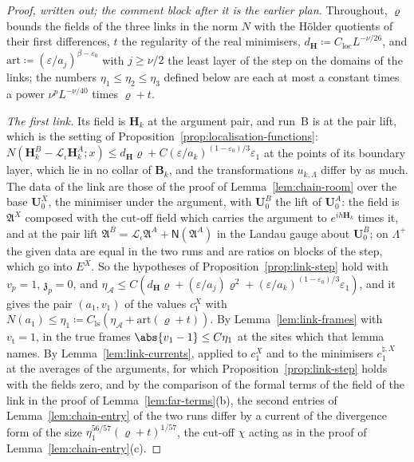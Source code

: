 \begin{proof}[Proof, written out; the comment block after it is the earlier plan]
Throughout, $\varrho$ bounds the fields of the three links in the norm $N$ with the H\"older quotients of their first differences, $t$ the regularity of the real minimisers, $d_{\mathbf H} \coloneqq C_{\mathrm{loc}}L^{-\nu/26}$, and $\mathrm{art} \coloneqq (\varepsilon/a_j)^{\beta-\varepsilon_0}$ with $j \geq \nu/2$ the least layer of the step on the domains of the links; the numbers $\eta_1 \leq \eta_2 \leq \eta_3$ defined below are each at most a constant times a power $\nu^pL^{-\nu/40}$ times $\varrho + t$.

\emph{The first link.} Its field is $\mathbf H_k$ at the argument pair, and run~B is at the pair lift, which is the setting of Proposition~\ref{prop:localisation-functions}: $N(\mathbf H^B_k - \mathcal L_\iota\mathbf H^A_k; x) \leq d_{\mathbf H}\varrho + C(\varepsilon/a_k)^{(1-\varepsilon_0)/3}\varepsilon_1$ at the points of its boundary layer, which lie in no collar of $\mathbf B_k$, and the transformations $u_{k,\Lambda}$ differ by as much. The data of the link are those of the proof of Lemma~\ref{lem:chain-room} over the base $\mathbf U^X_0$, the minimiser under the argument, with $\mathbf U^B_0$ the lift of $\mathbf U^A_0$: the field is $\mathfrak A^X$ composed with the cut-off field which carries the argument to $e^{ih\mathbf H_k}$ times it, and at the pair lift $\mathfrak A^B = \mathcal L_\iota\mathfrak A^A + \mathsf N(\mathfrak A^A)$ in the Landau gauge about $\mathbf U^B_0$; on $\Lambda^+$ the given data are equal in the two runs and are ratios on blocks of the step, which go into $E^X$. So the hypotheses of Proposition~\ref{prop:link-step} hold with $v_p = 1$, $\mathfrak z_p = 0$, and $\eta_{\mathcal A} \leq C(d_{\mathbf H}\varrho + (\varepsilon/a_j)\varrho^2 + (\varepsilon/a_k)^{(1-\varepsilon_0)/3}\varepsilon_1)$, and it gives the pair $(a_1, v_1)$ of the values $c^X_1$ with $N(a_1) \leq \eta_1 \coloneqq C_{\mathrm{ls}}(\eta_{\mathcal A} + \mathrm{art}(\varrho + t))$. By Lemma~\ref{lem:link-frames} with $v_{\mathrm t} = 1$, in the true frames $\abs{v_1 - 1} \leq C\eta_1$ at the sites which that lemma names. By Lemma~\ref{lem:link-currents}, applied to $c^X_1$ and to the minimisers $c^{\natural,X}_1$ at the averages of the arguments, for which Proposition~\ref{prop:link-step} holds with the fields zero, and by the comparison of the formal terms of the field of the link in the proof of Lemma~\ref{lem:far-terms}(b), the second entries of Lemma~\ref{lem:chain-entry} of the two runs differ by a current of the divergence form of the size $\eta_1^{56/57}(\varrho + t)^{1/57}$, the cut-off $\chi$ acting as in the proof of Lemma~\ref{lem:chain-entry}(c).


\end{proof}
